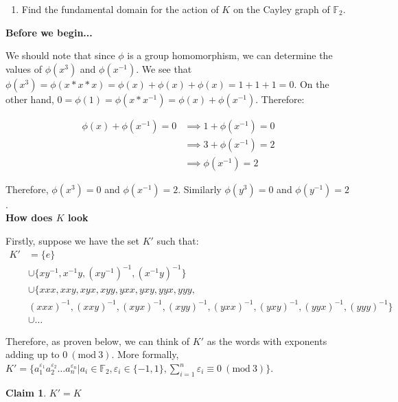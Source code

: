 \documentclass[12pt]{article}%
\newtheorem{claim}[theorem]{Claim}
\newcommand{\F}{\mathbb{F}}
\newcommand{\Mod}[1]{\ (\mathrm{mod}\ #1)}
\begin{document}
\renewcommand{\labelenumi}{\alph{enumi}}
\begin{enumerate}
  \item Find the fundamental domain for the action of $K$ on the Cayley graph of $\F_2$.
\end{enumerate}

\textbf{Before we begin...}

We should note that since $\phi$ is a group homomorphism, we can determine the values of $\phi(x^3)$ and
$\phi(x^{-1})$. We see that $\phi(x^3)=\phi(x*x*x)=\phi(x)+\phi(x)+\phi(x)=1+1+1=0$. On the other hand,
$0=\phi(1)=\phi(x*x^{-1})=\phi(x)+\phi(x^{-1})$. Therefore:

\begin{align*}
\phi(x)+\phi(x^{-1})=0
&\implies 1+\phi(x^{-1})=0\\
&\implies 3+\phi(x^{-1})=2\\
&\implies \phi(x^{-1})=2
\end{align*}

Therefore, $\phi(x^3)=0$ and $\phi(x^{-1})=2$.  Similarly  $\phi(y^3)=0$ and $\phi(y^{-1})=2$.\\

\textbf{How does $K$ look}

Firstly, suppose we have the set $K'$ such that:
\begin{align*}
K'
&=\{e\} \\
&\cup\{xy^{-1}, x^{-1}y, (xy^{-1})^{-1}, (x^{-1}y)^{-1}\} \\
&\cup\{xxx,xxy,xyx,xyy,yxx,yxy,yyx,yyy, \\
&(xxx)^{-1},(xxy)^{-1},(xyx)^{-1},(xyy)^{-1},(yxx)^{-1},(yxy)^{-1},(yyx)^{-1},(yyy)^{-1}\} \\
&\cup \ldots
\end{align*}

Therefore, as proven below, we can think of $K'$ as the words with exponents adding up to $0 \Mod{3}$.
More formally, $K'=\{a_{1}^{\varepsilon_1}a_{2}^{\varepsilon_2}\ldots a_{n}^{\varepsilon_n} | a_i\in \F_2,
\varepsilon_i\in \{-1, 1\}, \sum_{i=1}^{n} \varepsilon_i \equiv 0 \Mod{3}\}$. \\

\begin{claim}
$K'=K$
\end{claim}
\end{document}
